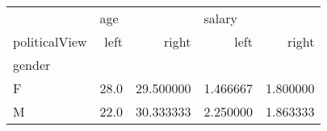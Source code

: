 \begin{tabular}{lrrrr}
\toprule
{} & \multicolumn{2}{l}{age} & \multicolumn{2}{l}{salary} \\
politicalView &  left &      right &      left &     right \\
gender &       &            &           &           \\
\midrule
F      &  28.0 &  29.500000 &  1.466667 &  1.800000 \\
M      &  22.0 &  30.333333 &  2.250000 &  1.863333 \\
\bottomrule
\end{tabular}
